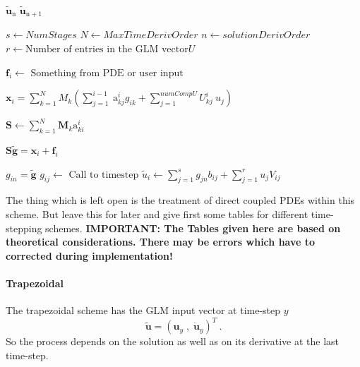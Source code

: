 \begin{algorithm}
\caption{Most general loop single PDE} \label{alg:genLoop}
\begin{algorithmic}
\REQUIRE $\mathbf{\tilde{u}}_{\mathrm{n}}$
\ENSURE  $\mathbf{\tilde{u}}_{\mathrm{n}+1}$

\STATE $s \gets NumStages$
\STATE $N \gets MaxTimeDerivOrder$
\STATE $n \gets solutionDerivOrder$
\STATE $r \gets \text{Number of entries in the GLM vector} U$

\STATE {}
\STATE $\mathbf{f}_i \gets \text{ Something from PDE or user input}$

\STATE {}
\STATE $\mathbf{x}_i = \sum_{k = 1}^{N} M_k \left( \sum_{j=1}^{i-1} \ \mathrm{a}^i_{kj} g_{ik} +
\sum_{j=1}^{numCompU}
U^i_{kj}\  u_j \right)$

\STATE {}
\STATE $\mathbf{S} \gets \sum_{k = 1}^{N} \mathbf{M}_k \mathrm{a}^i_{ki}$

\STATE {}

\STATE {}
\STATE $\mathbf{S} \mathbf{\tilde{g}} = \mathbf{x}_i + \mathbf{f}_i$

\STATE {}
\STATE $g_{in} = \mathbf{\tilde{g}} $
\STATE {}
\STATE $g_{ij} \gets \text{ Call to timestep} $
\ENDIF
\ENDFOR
\ENDFOR
\STATE {}
\STATE $\tilde{u}_i \gets \sum_{j=1}^{s} g_{jn} b_{ij} + \sum_{j=1}^{r} u_{j} V_{ij}$
\ENDFOR
\end{algorithmic}
\end{algorithm}

The thing which is left open is the treatment of direct coupled PDEs within this scheme.
But leave this for later and give first some tables for different time-stepping schemes.\newline
{\bf IMPORTANT:\newline
The Tables given here are based on theoretical considerations. There may be errors which have to
corrected during implementation!}
\paragraph{Trapezoidal}
The trapezoidal scheme has the GLM input vector at time-step $y$
\begin{equation*}
\mathbf{\tilde{u}} = \left( \mathbf{u}_y\; ,\; \mathbf{\dot{u}}_y \right)^T\ .
\end{equation*}
So the process depends on the solution as well as on its derivative at the last time-step.

